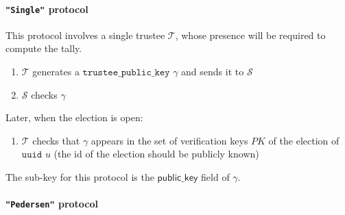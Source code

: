 \documentclass[a4paper]{article}
\newcommand{\uuid}{\texttt{uuid}}
\newcommand{\tpk}{\texttt{trustee\_public\_key}}
\begin{document}
\paragraph{\texttt{"Single"} protocol}

This protocol involves a single trustee $\mathcal{T}$, whose presence
will be required to compute the tally.
\begin{enumerate}
\item $\mathcal{T}$ generates a \hyperref[trustee-keys]{$\tpk$}
  $\gamma$ and sends it to $\mathcal{S}$
\item $\mathcal{S}$ checks $\gamma$
\end{enumerate}
Later, when the election is open:
\begin{enumerate}
\item $\mathcal{T}$ checks that $\gamma$ appears in the set of verification
  keys $PK$ of the election of {$\uuid$} $u$ (the id of the election
  should be publicly known)
\end{enumerate}
The sub-key for this protocol is the $\textsf{public\_key}$ field of
$\gamma$.

\paragraph{\texttt{"Pedersen"} protocol}
\end{document}
